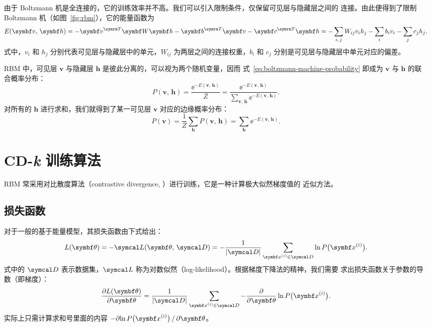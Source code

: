 由于 Boltzmann 机是全连接的，它的训练效率并不高。我们可以引入限制条件，仅保留可见层与隐藏层之间的
连接。由此便得到了限制 Boltzmann 机（如图~\ref{fig:rbm}），它的能量函数为
\begin{equation}
  \label{eq:rbm-energy}
  E(\bm{v},\,\bm{h})
  = - \bm{v}^\trans \bm{W} \bm{h} - \bm{b}^\trans \bm{v} - \bm{c}^\trans \bm{h}
  = - \sum_{i,\,j} W_{ij} v_i h_j - \sum_i b_i v_i - \sum_j c_j h_j.
\end{equation}
式中，$v_i$ 和 $h_j$ 分别代表可见层与隐藏层中的单元，$W_{ij}$ 为两层之间的连接权重，$b_i$ 和 $c_j$
分别是可见层与隐藏层中单元对应的偏差。

RBM 中，可见层 $\bm{v}$ 与隐藏层 $\bm{h}$ 是彼此分离的，可以视为两个随机变量，因而
式~\eqref{eq:boltzmann-machine-probability} 即成为 $\bm{v}$ 与 $\bm{h}$ 的联合概率分布：
\begin{equation}
  P(\bm{v},\,\bm{h})
  = \frac{\ee^{-E(\bm{v},\,\bm{h})}}{Z}
  = \frac{\ee^{-E(\bm{v},\,\bm{h})}}{\sum_{\bm{v},\,\bm{h}}\ee^{-E(\bm{v},\,\bm{h})}}.
\end{equation}
对所有的 $\bm{h}$ 进行求和，我们就得到了某一可见层 $\bm{v}$ 对应的边缘概率分布：
\begin{equation}
  \label{eq:rbm-probability}
  P(\bm{v}) = \frac{1}{Z} \sum_{\bm{h}} P(\bm{v},\,\bm{h})
            = \sum_{\bm{h}} \ee^{-E(\bm{v},\,\bm{h})}.
\end{equation}

\section{CD-\textit{k} 训练算法}

RBM 常采用对比散度算法（contrastive divergence, \CDk）进行训练，它是一种计算极大似然梯度值的
近似方法。

\subsection{损失函数}

对于一般的基于能量模型，其损失函数由下式给出：
\begin{equation}
  L(\bm{\theta})
  = - \likeL(\bm{\theta},\,\domD)
  = - \frac{1}{\abs{\domD}} \sum_{\bm{x}^{(i)}\in\domD} \ln P\qty\big(\bm{x}^{(i)}).
\end{equation}
式中的 $\domD$ 表示数据集，$\likeL$ 称为对数似然（log-likelihood）。根据梯度下降法的精神，我们需要
求出损失函数关于参数的导数（即梯度）：
\begin{equation}
  \pdv{L(\bm{\theta})}{\bm{\theta}}
  = \frac{1}{\abs{\domD}} \sum_{\bm{x}^{(i)}\in\domD}
    - \pdv{\bm{\theta}} \ln P\qty\big(\bm{x}^{(i)}).
\end{equation}
实际上只需计算求和号里面的内容 $-\partial{\ln P\qty\big(\bm{x}^{(i)})}\,/\,\partial{\bm{\theta}}$。

